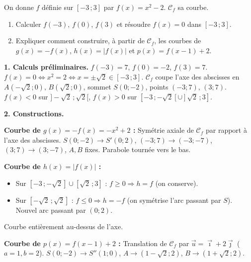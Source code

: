 \documentclass[11pt]{article}
\begin{document}
\begin{exoresolu}
On donne $f$ définie sur $[-3\,;3]$ par $f(x)=x^2-2$. $\mathcal{C}_f$ sa courbe.
\begin{enumerate}
\item Calculer $f(-3)$, $f(0)$, $f(3)$ et résoudre $f(x)=0$ dans $[-3\,;3]$.
\item Expliquer comment construire, à partir de $\mathcal{C}_f$, les courbes de $g(x)=-f(x)$, $h(x)=|f(x)|$ et $p(x)=f(x-1)+2$.
\end{enumerate}
\tcblower
\textbf{1. Calculs préliminaires.}
$f(-3)=7$, $f(0)=-2$, $f(3)=7$.
$f(x)=0 \iff x^2=2 \iff x=\pm\sqrt{2}\in[-3\,;3]$.
$\mathcal{C}_f$ coupe l'axe des abscisses en $A(-\sqrt{2};0)$, $B(\sqrt{2};0)$, sommet $S(0;-2)$, points $(-3;7)$, $(3;7)$.
$f(x)<0$ sur $]-\sqrt{2}\,;\sqrt{2}[$, $f(x)>0$ sur $[-3\,;-\sqrt{2}[\cup]\sqrt{2}\,;3]$.

\textbf{2. Constructions.}

\textbf{Courbe de $g(x)=-f(x)=-x^2+2$ :} Symétrie axiale de $\mathcal{C}_f$ par rapport à l'axe des abscisses.
$S(0;-2)\to S'(0;2)$, $(-3;7)\to(-3;-7)$, $(3;7)\to(3;-7)$, $A,B$ fixes. Parabole tournée vers le bas.

\textbf{Courbe de $h(x)=|f(x)|$ :}
\begin{itemize}
\item Sur $[-3\,;-\sqrt{2}]\cup[\sqrt{2}\,;3]$ : $f\ge0 \Rightarrow h=f$ (on conserve).
\item Sur $[-\sqrt{2}\,;\sqrt{2}]$ : $f\le0 \Rightarrow h=-f$ (on symétrise l'arc passant par $S$). Nouvel arc passant par $(0;2)$.
\end{itemize}
Courbe entièrement au-dessus de l'axe.

\textbf{Courbe de $p(x)=f(x-1)+2$ :} Translation de $\mathcal{C}_f$ par $\vec{u}=\vec{\imath}+2\vec{\jmath}$ ($a=1,b=2$).
$S(0;-2)\to S''(1;0)$, $A\to(1-\sqrt{2};2)$, $B\to(1+\sqrt{2};2)$.
\end{exoresolu}
\end{document}

